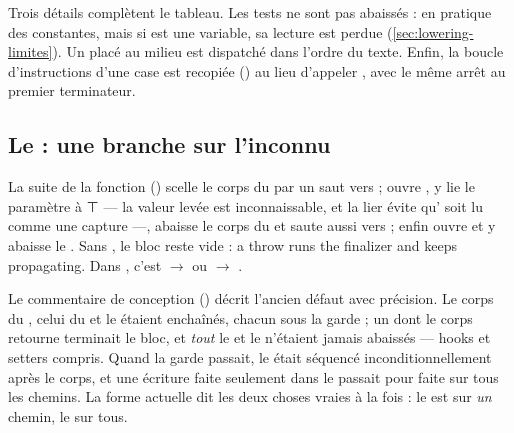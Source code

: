 Trois détails complètent le tableau. Les tests  ne sont pas abaissés : en pratique des constantes, mais si  est une variable, sa lecture est perdue (\cref{sec:lowering-limites}). Un  placé au milieu est dispatché dans l'ordre du texte. Enfin, la boucle d'instructions d'une case est recopiée () au lieu d'appeler , avec le même arrêt au premier terminateur.

\subsection{Le  : une branche sur l'inconnu}


La suite de la fonction () scelle le corps du  par un saut vers  ; ouvre , y lie le paramètre  à ⊤ --- la valeur levée est inconnaissable, et la lier évite qu' soit lu comme une capture ---, abaisse le corps du  et saute aussi vers  ; enfin ouvre  et y abaisse le . Sans , le bloc  reste vide : \og a throw runs the finalizer and keeps propagating\fg{}. Dans , c'est  $\to$  ou  $\to$ .

Le commentaire de conception () décrit l'ancien défaut avec précision. Le corps du , celui du  et le  étaient enchaînés, chacun sous la garde  ; un  dont le corps retourne terminait le bloc, et \emph{tout} le  et le  n'étaient jamais abaissés --- hooks et setters compris. Quand la garde passait, le  était séquencé inconditionnellement après le corps, et une écriture faite seulement dans le  passait pour faite sur tous les chemins. La forme actuelle dit les deux choses vraies à la fois : le  est sur \emph{un} chemin, le  sur tous.

